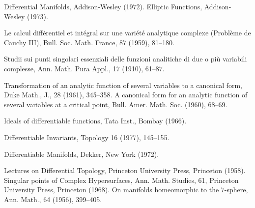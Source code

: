 \begin{sourcebibliography}
 Differential Manifolds, Addison-Wesley (1972).
 Elliptic Functions, Addison-Wesley (1973).
\end{sourcebibliography}
\begin{sourcebibliography}
 Le calcul diff\'erentiel et int\'egral sur une vari\'et\'e analytique complexe (Probl\`eme de Cauchy III), Bull. Soc. Math. France, 87 (1959), 81--180.
\end{sourcebibliography}
\begin{sourcebibliography}
 Studii sui punti singolari essenziali delle funzioni analitiche di due o pi\`u variabili complesse, Ann. Math. Pura Appl., 17 (1910), 61--87.
\end{sourcebibliography}
\begin{sourcebibliography}
 Transformation of an analytic function of several variables to a canonical form, Duke Math., J., 28 (1961), 345--358.
 A canonical form for an analytic function of several variables at a critical point, Bull. Amer. Math. Soc. (1960), 68--69.
\end{sourcebibliography}
\begin{sourcebibliography}
 Ideals of differentiable functions, Tata Inst., Bombay (1966).
\end{sourcebibliography}
\begin{sourcebibliography}
 Differentiable Invariants, Topology 16 (1977), 145--155.
\end{sourcebibliography}
\begin{sourcebibliography}
 Differentiable Manifolds, Dekker, New York (1972).
\end{sourcebibliography}
\begin{sourcebibliography}
 Lectures on Differential Topology, Princeton University Press, Princeton (1958).
 Singular points of Complex Hypersurfaces, Ann. Math. Studies, 61, Princeton University Press, Princeton (1968).
 On manifolds homeomorphic to the 7-sphere, Ann. Math., 64 (1956), 399--405.
\end{sourcebibliography}
